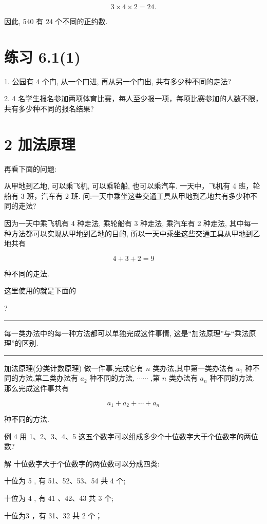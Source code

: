 \documentclass[10pt]{article}
\newcommand{\HRule}{\begin{center}\rule{0.9\linewidth}{0.2mm}\end{center}}
\begin{document}
\[
3 \times  4 \times  2 = {24}.
\]

因此, 540 有 24 个不同的正约数.

\section*{练习 6.1(1)}

1. 公园有 4 个门, 从一个门进, 再从另一个门出, 共有多少种不同的走法?

2. 4 名学生报名参加两项体育比赛，每人至少报一项，每项比赛参加的人数不限，共有多少种不同的报名结果?

\section*{2 加法原理}

再看下面的问题:

从甲地到乙地, 可以乘飞机, 可以乘轮船, 也可以乘汽车. 一天中，飞机有 4 班，轮船有 3 班，汽车有 2 班. 问:一天中乘坐这些交通工具从甲地到乙地共有多少种不同的走法?

因为一天中乘飞机有 4 种走法, 乘轮船有 3 种走法, 乘汽车有 2 种走法, 其中每一种方法都可以实现从甲地到乙地的目的, 所以一天中乘坐这些交通工具从甲地到乙地共有

\[
4 + 3 + 2 = 9
\]

种不同的走法.

这里使用的就是下面的

?

\HRule

每一类办法中的每一种方法都可以单独完成这件事情, 这是“加法原理”与“乘法原理”的区别.

\HRule

加法原理(分类计数原理) 做一件事,完成它有 \(n\) 类办法,其中第一类办法有 \({a}_{1}\) 种不同的方法,第二类办法有 \({a}_{2}\) 种不同的方法, \(\cdots \cdots\) ,第 \(n\) 类办法有 \({a}_{n}\) 种不同的方法. 那么完成这件事共有

\[
{a}_{1} + {a}_{2} + \cdots  + {a}_{n}
\]

种不同的方法.

例 4 用 1、2、3、4、5 这五个数字可以组成多少个十位数字大于个位数字的两位数?

解 十位数字大于个位数字的两位数可以分成四类:

十位为 5 , 有 51、52、53、54 共 4 个;



十位为 4 , 有 41 、42、43 共 3 个;

十位为3 ，有 31、32 共 2 个；
\end{document}
